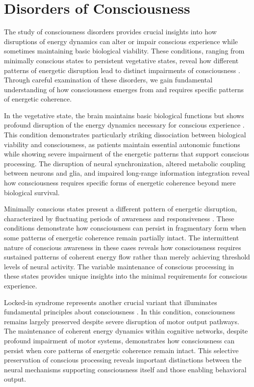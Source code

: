 \section{Disorders of Consciousness}

The study of consciousness disorders provides crucial insights into how disruptions of energy dynamics can alter or impair conscious experience while sometimes maintaining basic biological viability. These conditions, ranging from minimally conscious states to persistent vegetative states, reveal how different patterns of energetic disruption lead to distinct impairments of consciousness \cite{Giacino2014}. Through careful examination of these disorders, we gain fundamental understanding of how consciousness emerges from and requires specific patterns of energetic coherence.

In the vegetative state, the brain maintains basic biological functions but shows profound disruption of the energy dynamics necessary for conscious experience \cite{Laureys2004}. This condition demonstrates particularly striking dissociation between biological viability and consciousness, as patients maintain essential autonomic functions while showing severe impairment of the energetic patterns that support conscious processing. The disruption of neural synchronization, altered metabolic coupling between neurons and glia, and impaired long-range information integration reveal how consciousness requires specific forms of energetic coherence beyond mere biological survival.

Minimally conscious states present a different pattern of energetic disruption, characterized by fluctuating periods of awareness and responsiveness \cite{DiPerri2014}. These conditions demonstrate how consciousness can persist in fragmentary form when some patterns of energetic coherence remain partially intact. The intermittent nature of conscious awareness in these cases reveals how consciousness requires sustained patterns of coherent energy flow rather than merely achieving threshold levels of neural activity. The variable maintenance of conscious processing in these states provides unique insights into the minimal requirements for conscious experience.

Locked-in syndrome represents another crucial variant that illuminates fundamental principles about consciousness \cite{Casali2013}. In this condition, consciousness remains largely preserved despite severe disruption of motor output pathways. The maintenance of coherent energy dynamics within cognitive networks, despite profound impairment of motor systems, demonstrates how consciousness can persist when core patterns of energetic coherence remain intact. This selective preservation of conscious processing reveals important distinctions between the neural mechanisms supporting consciousness itself and those enabling behavioral output.

